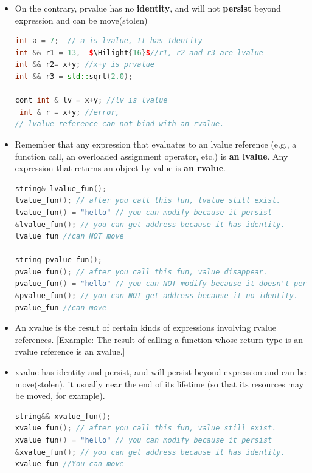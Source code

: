 \documentclass[a4paper,12pt,twoside]{book}
\newcommand{\Hilight}[1]{\makebox[0pt][l]{\color{yellow}\rule[-3pt]{#1em}{11pt}}}
\begin{document}
\begin{itemize}
\item On the contrary, prvalue has no \textbf{identity}, and will not \textbf{persist} beyond expression and can be move(stolen)

\begin{lstlisting}[frame=single, language=c++, mathescape=true]
int a = 7;  // a is lvalue, It has Identity
int && r1 = 13,  $\Hilight{16}$//r1, r2 and r3 are lvalue
int && r2= x+y; //x+y is prvalue
int && r3 = std::sqrt(2.0);

cont int & lv = x+y; //lv is lvalue
 int & r = x+y; //error,
// lvalue reference can not bind with an rvalue.
\end{lstlisting}





\item Remember that any expression that evaluates to an lvalue reference (e.g., a function call, an overloaded assignment operator, etc.) is \textbf{an lvalue}. Any expression that returns an object by value is \textbf{an rvalue}.

\begin{lstlisting}[frame=single, language=c++, mathescape=true]
string& lvalue_fun();
lvalue_fun(); // after you call this fun, lvalue still exist.
lvalue_fun() = "hello" // you can modify because it persist
&lvalue_fun(); // you can get address because it has identity.
lvalue_fun //can NOT move

string pvalue_fun();
pvalue_fun(); // after you call this fun, value disappear.
pvalue_fun() = "hello" // you can NOT modify because it doesn't persist
&pvalue_fun(); // you can NOT get address because it no identity.
pvalue_fun //can move

\end{lstlisting}

\item An xvalue is the result of certain kinds of expressions involving rvalue references. [Example: The result of calling a function whose return type is an rvalue reference is an xvalue.]

\item xvalue has identity and persist, and will persist beyond expression and can be move(stolen). it usually near the end of its lifetime (so that its resources may be moved, for example).
\begin{lstlisting}[frame=single, language=c++, mathescape=true]
string&& xvalue_fun();
xvalue_fun(); // after you call this fun, value still exist.
xvalue_fun() = "hello" // you can modify because it persist
&xvalue_fun(); // you can get address because it has identity.
xvalue_fun //You can move
\end{lstlisting}



\end{itemize}
\end{document}
